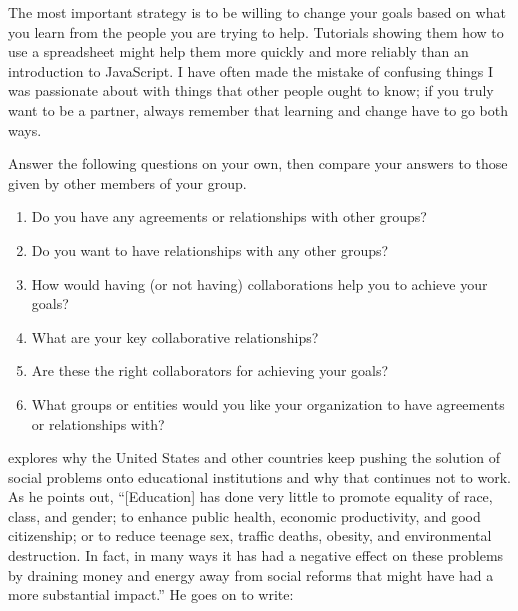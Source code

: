 The most important strategy is
to be willing to change your goals
based on what you learn from the people you are trying to help.
Tutorials showing them how to use a spreadsheet
might help them more quickly and more reliably than
an introduction to JavaScript.
I have often made the mistake of confusing things I was passionate about
with things that other people ought to know;
if you truly want to be a partner,
always remember that learning and change have to go both ways.



Answer the following questions on your own,
then compare your answers to those given by other members of your group.

\begin{enumerate}

\item
  Do you have any agreements or relationships with other groups?

\item
  Do you want to have relationships with any other groups?

\item
  How would having (or not having) collaborations
  help you to achieve your goals?

\item
  What are your key collaborative relationships?

\item
  Are these the right collaborators for achieving your goals?

\item
  What groups or entities would you like your organization
  to have agreements or relationships with?

\end{enumerate}


\cite{Laba2008} explores why the United States and other countries
keep pushing the solution of social problems onto educational institutions
and why that continues not to work.
As he points out,
``[Education] has done very little to promote equality of race, class, and gender;
to enhance public health, economic productivity, and good citizenship;
or to reduce teenage sex, traffic deaths, obesity, and environmental destruction.
In fact,
in many ways it has had a negative effect on these problems
by draining money and energy away from social reforms that might have had a more substantial impact.''
He goes on to write:

